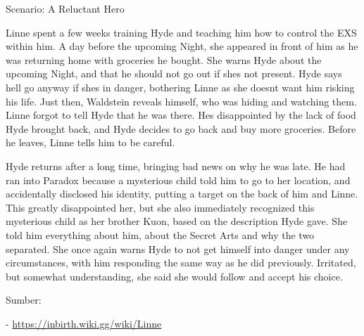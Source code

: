 \begin{tcolorbox}[breakable, colback=white, colframe=black!80,
  boxrule=0.6pt, arc=0mm, left=3mm, right=3mm, top=2mm, bottom=2mm]
\medskip
Scenario: A Reluctant Hero\par
Linne spent a few weeks training Hyde and teaching him how to control the EXS within him. A day before the upcoming Night, she appeared in front of him as he was returning home with groceries he bought. She warns Hyde about the upcoming Night, and that he should not go out if she\textquotesingle{}s not present. Hyde says he\textquotesingle{}ll go anyway if she\textquotesingle{}s in danger, bothering Linne as she doesn\textquotesingle{}t want him risking his life. Just then, Waldstein reveals himself, who was hiding and watching them. Linne forgot to tell Hyde that he was there. He\textquotesingle{}s disappointed by the lack of food Hyde brought back, and Hyde decides to go back and buy more groceries. Before he leaves, Linne tells him to be careful.\par
\medskip
Hyde returns after a long time, bringing bad news on why he was late. He had ran into Paradox because a mysterious child told him to go to her location, and accidentally disclosed his identity, putting a target on the back of him and Linne. This greatly disappointed her, but she also immediately recognized this mysterious child as her brother Kuon, based on the description Hyde gave. She told him everything about him, about the Secret Arts and why the two separated. She once again warns Hyde to not get himself into danger under any circumstances, with him responding the same way as he did previously. Irritated, but somewhat understanding, she said she would follow and accept his choice.\par
\bigskip
Sumber:\par
\hspace*{1.5em}- \url{https://inbirth.wiki.gg/wiki/Linne}
\end{tcolorbox}
